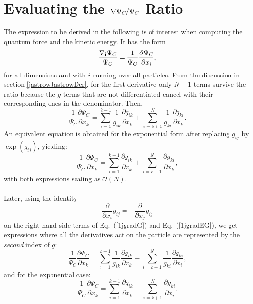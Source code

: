 \section{Evaluating the ${\bf \nabla} \Psi_C/\Psi_C$ Ratio}\label{gradJastrow}
The expression to be derived in the following is of interest when computing the quantum force and the kinetic energy. It has the form
$$
\frac{{\bf {\nabla_i}}\Psi_C}{\Psi_C} = \frac{1}{\Psi_C}\frac{\partial \Psi_C}{\partial x_i},
$$
for all dimensions and with $i$ running over all particles.
From the discussion in section \ref{jastrowJastrowDer}, for the first derivative only $N-1$ terms survive the ratio because the $g$-terms that are not differentiated cancel with their corresponding ones in the denominator. Then,
\begin{equation}\label{1jgradG}
\frac{1}{\Psi_C}\frac{\partial \Psi_C}{\partial x_k} =
\sum_{i=1}^{k-1}\frac{1}{g_{ik}}\frac{\partial g_{ik}}{\partial x_k}
+
\sum_{i=k+1}^{N}\frac{1}{g_{ki}}\frac{\partial g_{ki}}{\partial x_k}.
\end{equation}
An equivalent equation is obtained for the exponential form after replacing $g_{ij}$ by $\exp(g_{ij})$, yielding:
\begin{equation}\label{1jgradEG}
\frac{1}{\Psi_C}\frac{\partial \Psi_C}{\partial x_k} =
\sum_{i=1}^{k-1}\frac{\partial g_{ik}}{\partial x_k}
+
\sum_{i=k+1}^{N}\frac{\partial g_{ki}}{\partial x_k},
\end{equation}
with both expressions scaling as $\mathcal{O}(N)$.\\
\\
\noindent
Later, using the identity 
\begin{equation}\label{firstDerIdentity}
\frac{\partial}{\partial x_i}g_{ij} = -\frac{\partial}{\partial x_j}g_{ij} 
\end{equation}
on the right hand side terms of Eq.~(\ref{1jgradG}) and Eq.~(\ref{1jgradEG}), we get expressions where all the derivatives act on the particle are represented by the
\emph{second} index of $g$:
\begin{equation}\label{gradJasGen}
\boxed{
\frac{1}{\Psi_C}\frac{\partial \Psi_C}{\partial x_k} =
\sum_{i=1}^{k-1}\frac{1}{g_{ik}}\frac{\partial g_{ik}}{\partial x_k}
-
\sum_{i=k+1}^{N}\frac{1}{g_{ki}}\frac{\partial g_{ki}}{\partial x_i},
}
\end{equation}
and for the exponential case:
\begin{equation}\label{gradJasGenExp}
\boxed{
\frac{1}{\Psi_C}\frac{\partial \Psi_C}{\partial x_k} =
\sum_{i=1}^{k-1}\frac{\partial g_{ik}}{\partial x_k}
-
\sum_{i=k+1}^{N}\frac{\partial g_{ki}}{\partial x_i}.
}
\end{equation}


